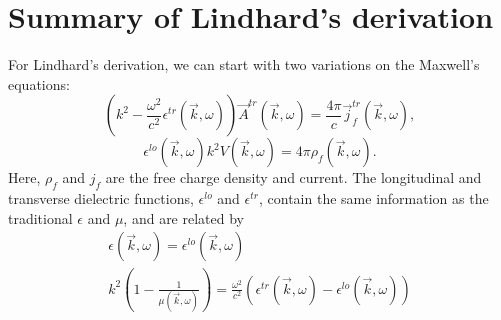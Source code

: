 \documentclass[../../main.tex]{subfiles}
\begin{document}
\newcommand{\frk}{k}
\newcommand{\frargs}{(\vec{\frk}, \omega)}

\section{Summary of Lindhard's derivation}

For Lindhard's derivation, we can start with two variations on the Maxwell's equations:
\begin{equation}
	\left(\frk^2 - \frac{\omega^2}{c^2} \epsilon^{tr}\frargs\right) \vec{A}^{tr}\frargs = \frac{4\pi}{c} \vec{j}^{tr}_{f}\frargs,
\end{equation}
\begin{equation}
	\epsilon^{lo}\frargs \frk^2 V\frargs = 4 \pi \rho_f\frargs.
\end{equation}
Here, $\rho_f$ and $j_f$ are the free charge density and current. The longitudinal and transverse dielectric functions, $\epsilon^{lo}$ and $\epsilon^{tr}$, contain the same information as the traditional $\epsilon$ and $\mu$, and are related by
\begin{gather}
	\epsilon\frargs = \epsilon^{lo}\frargs \\
	\frk^2 \left(1 - \frac{1}{\mu\frargs}\right) = \frac{\omega^2}{c^2} \left(\epsilon^{tr}\frargs - \epsilon^{lo}\frargs\right)
\end{gather}
\end{document}
